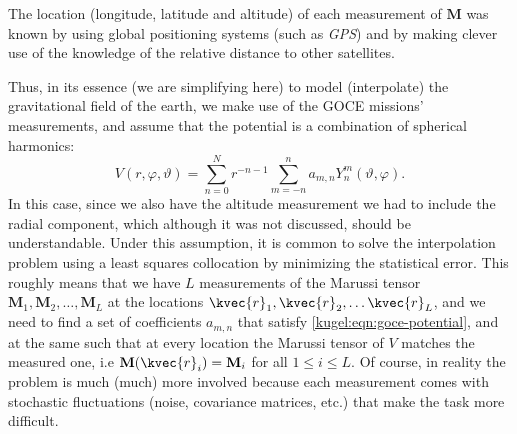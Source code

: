 The location (longitude, latitude and altitude) of each measurement of
$\mathbf{M}$ was known by using global positioning systems (such as \emph{GPS}) and by
making clever use of the knowledge of the relative distance to other satellites.

Thus, in its essence (we are simplifying here) to model (interpolate) the
gravitational field of the earth, we make use of the GOCE missions'
measurements, and assume that the potential is a combination of spherical
harmonics:
\begin{equation}
  \label{kugel:eqn:goce-potential}
  V(r,\varphi,\vartheta)
  = \sum_{n=0}^N r^{-n -1} \sum_{m=-n}^n
    a_{m,n} Y^m_n (\vartheta, \varphi).
\end{equation}
In this case, since we also have the altitude measurement we had to include the
radial component, which although it was not discussed, should be understandable.
Under this assumption, it is common to solve the interpolation problem using a
least squares collocation by minimizing the statistical error. This roughly
means that we have $L$ measurements of the Marussi tensor $\mathbf{M}_1,
\mathbf{M}_2, \ldots, \mathbf{M}_L$ at the locations $\kvec{r}_1, \kvec{r}_2,
\ldots \kvec{r}_L$, and we need to find a set of coefficients $a_{m,n}$ that
satisfy \eqref{kugel:eqn:goce-potential}, and at the same such that at every
location the Marussi tensor of $V$ matches the measured one, i.e
$\mathbf{M}(\kvec{r}_i) = \mathbf{M}_i$ for all $1 \leq i \leq L$. Of course, in
reality the problem is much (much) more involved because each measurement comes
with stochastic fluctuations (noise, covariance matrices, etc.) that make the
task more difficult.
